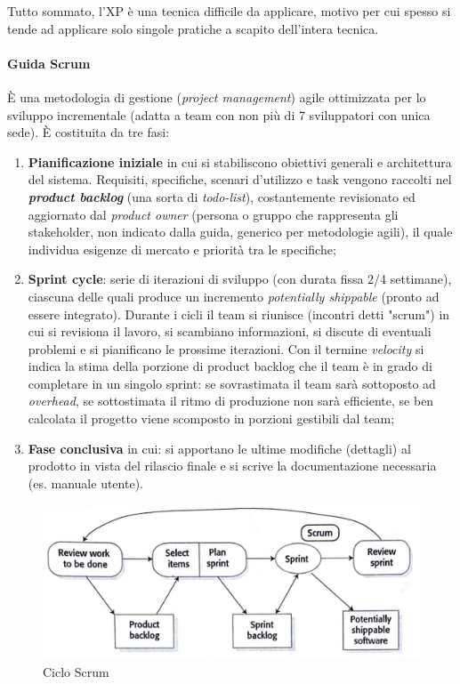 Tutto sommato, l'XP è una tecnica difficile da applicare, motivo per cui spesso si tende ad applicare solo singole pratiche a scapito dell'intera tecnica.

\paragraph{Guida Scrum} È una metodologia di gestione (\textit{project management}) agile ottimizzata per lo sviluppo incrementale (adatta a team con non più di 7 sviluppatori con unica sede). È costituita da tre fasi:
\begin{enumerate}
    \item \textbf{Pianificazione iniziale} in cui si stabiliscono obiettivi generali e architettura del sistema. Requisiti, specifiche, scenari d'utilizzo e task vengono raccolti nel \textbf{\textit{product backlog}} (una sorta di \textit{todo-list}), costantemente revisionato ed aggiornato dal \textit{product owner} (persona o gruppo che rappresenta gli stakeholder, non indicato dalla guida, generico per metodologie agili), il quale individua esigenze di mercato e priorità tra le specifiche;
    \item \textbf{Sprint cycle}: serie di iterazioni di sviluppo (con durata fissa 2/4 settimane), ciascuna delle quali produce un incremento \textit{potentially shippable} (pronto ad essere integrato). Durante i cicli il team si riunisce (incontri detti "scrum") in cui si revisiona il lavoro, si scambiano informazioni, si discute di eventuali problemi e si pianificano le prossime iterazioni. Con il termine \textit{velocity} si indica la stima della porzione di product backlog che il team è in grado di completare in un singolo sprint: se sovrastimata il team sarà sottoposto ad  \textit{overhead}, se sottostimata il ritmo di produzione non sarà efficiente, se ben calcolata il progetto viene scomposto in porzioni gestibili dal team;
    \item \textbf{Fase conclusiva} in cui: si apportano le ultime modifiche (dettagli) al prodotto in vista del rilascio finale e si scrive la documentazione necessaria (es. manuale utente).
\end{enumerate}

\begin{figure}[H]
    \centering
    \includegraphics[width=0.75\linewidth]{assets/sprint-cycle.png}
    \caption{Ciclo Scrum}
    \label{fig:sprint-cycle}
\end{figure}

